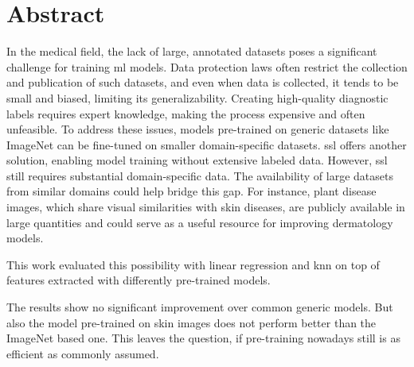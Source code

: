 \chapter*{Abstract}

In the medical field, the lack of large, annotated datasets poses a significant challenge for training \gls{ml} models. 
Data protection laws often restrict the collection and publication of such datasets, and even when data is collected, it tends to be small and biased, limiting its generalizability. Creating high-quality diagnostic labels requires expert knowledge, making the process expensive and often unfeasible. To address these issues, models pre-trained on generic datasets like ImageNet can be fine-tuned on smaller domain-specific datasets. \gls{ssl} offers another solution, enabling model training without extensive labeled data. However, \gls{ssl} still requires substantial domain-specific data. The availability of large datasets from similar domains could help bridge this gap. For instance, plant disease images, which share visual similarities with skin diseases, are publicly available in large quantities and could serve as a useful resource for improving dermatology models.

This work evaluated this possibility with linear regression and \gls{knn} on top of features extracted with differently pre-trained models.

The results show no significant improvement over common generic models. 
But also the model pre-trained on skin images does not perform better than the ImageNet based one. 
This leaves the question, if pre-training nowadays still is as efficient as commonly assumed.


